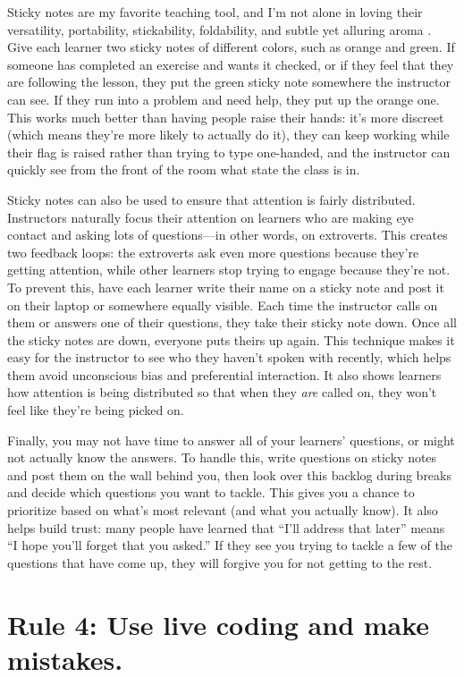 \documentclass[10pt,letterpaper]{article}
\newcommand{\rulemajor}[1]{\section{#1}}
\begin{document}
Sticky notes are my favorite teaching tool,
and I'm not alone in loving their versatility,
portability, stickability, foldability,
and subtle yet alluring aroma \cite{Ward2015}.
Give each learner two sticky notes of different colors,
such as orange and green.
If someone has completed an exercise and wants it checked,
or if they feel that they are following the lesson,
they put the green sticky note somewhere the instructor can see.
If they run into a problem and need help,
they put up the orange one.
This works much better than having people raise their hands:
it's more discreet (which means they're more likely to actually do it),
they can keep working while their flag is raised rather than trying to type one-handed,
and the instructor can quickly see from the front of the room what state the class is in.

Sticky notes can also be used to ensure that attention is fairly distributed.
Instructors naturally focus their attention on learners
who are making eye contact and asking lots of questions---in other words, on extroverts.
This creates two feedback loops:
the extroverts ask even more questions because they're getting attention,
while other learners stop trying to engage because they're not.
To prevent this,
have each learner write their name on a sticky note
and post it on their laptop or somewhere equally visible.
Each time the instructor calls on them or answers one of their questions,
they take their sticky note down.
Once all the sticky notes are down,
everyone puts theirs up again.
This technique makes it easy for the instructor to see who they haven't spoken with recently,
which helps them avoid unconscious bias and preferential interaction.
It also shows learners how attention is being distributed
so that when they \emph{are} called on,
they won't feel like they're being picked on.

Finally,
you may not have time to answer all of your learners' questions,
or might not actually know the answers.
To handle this,
write questions on sticky notes and post them on the wall behind you,
then look over this backlog during breaks and decide which questions you want to tackle.
This gives you a chance to prioritize based on what's most relevant (and what you actually know).
It also helps build trust:
many people have learned that ``I'll address that later''
means ``I hope you'll forget that you asked.''
If they see you trying to tackle a few of the questions that have come up,
they will forgive you for not getting to the rest.

\rulemajor{Rule 4: Use live coding and make mistakes.}
\end{document}
